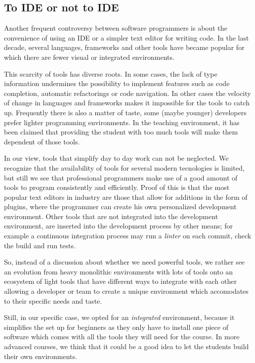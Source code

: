 \subsection{To IDE or not to IDE}
Another frequent controversy between software programmers is about the convenience of using an IDE or a simpler text editor for writing code. In the last decade, several languages, frameworks and other tools have became popular for which there are fewer visual or integrated environments. 

This scarcity of tools has diverse roots. In some cases, the lack of type information undermines the possibility to implement features such as code completion, automatic refactorings or code navigation.
In other cases the velocity of change in languages and frameworks makes it impossible for the tools to catch up.
Frequently there is also a matter of taste, some (maybe younger) developers prefer lighter programming environments.
In the teaching environment, it has been claimed that providing the student with too much tools will make them dependent of those tools.

In our view, tools that simplify day to day work can not be neglected. We recognize that the availability of tools for several modern tecnologies is limited, but still we see that professional programmers make use of a good amount of tools to program consistently and efficiently.
Proof of this is that the most popular text editors in industry are those that allow for additions in the form of plugins, where the programmer can create his own personalized development environment.
Other tools that are not integrated into the development environment, are inserted into the development process by other means; for example a continuous integration process may run a \emph{linter} on each commit, check the build and run tests.

So, instead of a discussion about whether we need powerful tools, we rather see an evolution from heavy monolithic environments with lots of tools onto an ecosystem of light tools that have different ways to integrate with each other allowing a developer or team to create a unique environment which accomodates to their specific needs and taste. 

Still, in our specific case, we opted for an \emph{integrated} environment, because it simplifies the set up for beginners as they only have to install one piece of software which comes with all the tools they will need for the course. In more advanced courses, we think that it could be a good idea to let the students build their own environments.

